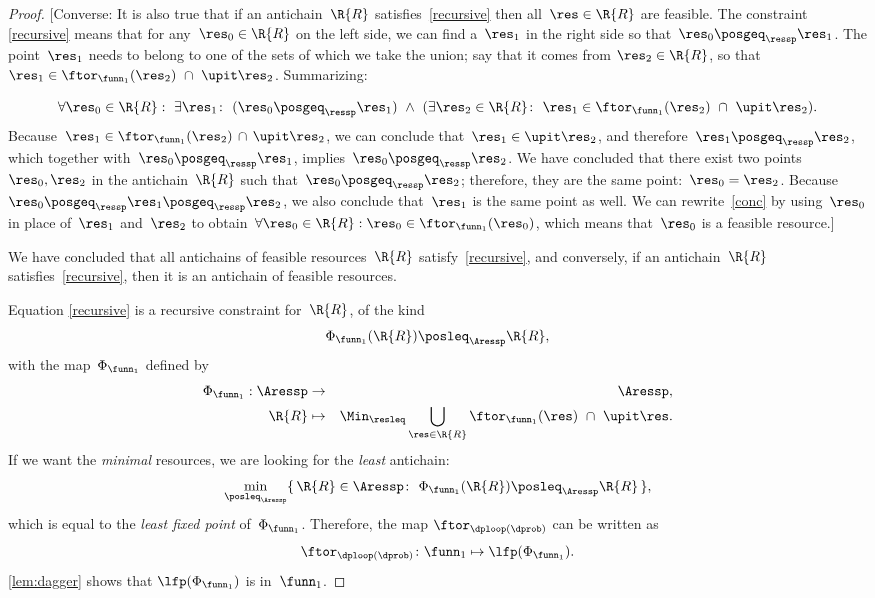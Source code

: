 \begin{proof}
{[}Converse: It is also true that if an antichain~$\R{R}$ satisfies~\eqref{recursive}
then all~$\res\in\R{R}$ are feasible. The constraint \eqref{recursive}
means that for any~$\res_{0}\in\R{R}$ on the left side, we can find
a~$\res_{1}$ in the right side so that~$\res_{0}\posgeq_{\ressp}\res_{1}$.
The point~$\res_{1}$ needs to belong to one of the sets of which
we take the union; say that it comes from $\res_{2}\in\R{R}$, so
that $\res_{1}\in\ftor_{\funn_{1}}(\res_{2})\ \cap\ \upit\res_{2}$.
Summarizing:

{\footnotesize{}
\begin{equation}
\forall\res_{0}\in\R{R}:\ \exists\res_{1}\colon\ (\res_{0}\posgeq_{\ressp}\res_{1})\ \wedge\ (\exists\res_{2}\in\R{R}\colon\ \res_{1}\in\ftor_{\funn_{1}}(\res_{2})\ \cap\ \upit\res_{2}).\label{eq:conc}
\end{equation}
}Because~$\res_{1}\in\ftor_{\funn_{1}}(\res_{2})\,\cap\,\upit\res_{2}$,
we can conclude that~$\res_{1}\in\upit\res_{2}$, and therefore~$\res_{1}\posgeq_{\ressp}\res_{2}$,
which together with~$\res_{0}\posgeq_{\ressp}\res_{1}$, implies~$\res_{0}\posgeq_{\ressp}\res_{2}$.
We have concluded that there exist two points~$\res_{0},\res_{2}$
in the antichain~$\R{R}$ such that~$\res_{0}\posgeq_{\ressp}\res_{2}$;
therefore, they are the same point:~$\res_{0}=\res_{2}$. Because~$\res_{0}\posgeq_{\ressp}\res_{1}\posgeq_{\ressp}\res_{2}$,
we also conclude that~$\res_{1}$ is the same point as well. We can
rewrite~\eqref{conc} by using~$\res_{0}$ in place of~$\res_{1}$
and~$\res_{2}$ to obtain~$\forall\res_{0}\in\R{R}:\res_{0}\in\ftor_{\funn_{1}}(\res_{0})$,
which means that~$\res_{0}$ is a feasible resource.{]}

We have concluded that all antichains of feasible resources~$\R{R}$
satisfy~\eqref{recursive}, and conversely, if an antichain~$\R{R}$
satisfies~\eqref{recursive}, then it is an antichain of feasible
resources. 

Equation \eqref{recursive} is a recursive constraint for~$\R{R}$,
of the kind 
\[
\Phi_{\funn_{1}}(\R{R})\posleq_{\Aressp}\R{R},
\]
with the map~$\Phi_{\funn_{1}}$ defined by
\begin{eqnarray}
\Phi_{\funn_{1}}:\Aressp & \rightarrow & \Aressp,\label{eq:bigphi}\\
\R{R} & \mapsto & \Min_{\resleq}\bigcup_{\res\in\R{R}}\ftor_{\funn_{1}}(\res)\ \cap\ \upit\res.\nonumber 
\end{eqnarray}
If we want the \emph{minimal} resources, we are looking for the \emph{least}
antichain: 
\[
\min_{\posleq_{\Aressp}}\{\,\R{R}\in\Aressp\colon\ \Phi_{\funn_{1}}(\R{R})\posleq_{\Aressp}\R{R}\,\},
\]
which is equal to the \emph{least fixed point }of~$\Phi_{\funn_{1}}$.
Therefore, the map $\ftor_{\dploop(\dprob)}$ can be written as
\begin{equation}
\ftor_{\dploop(\dprob)}\colon\funn_{1}\mapsto\lfp(\Phi_{\funn_{1}}).\label{eq:loop_fixpoint}
\end{equation}
\cref{lem:dagger} shows that $\lfp(\Phi_{\funn_{1}})$ is \scottcontinuous
in~$\funn_{1}$. 
\end{proof}

